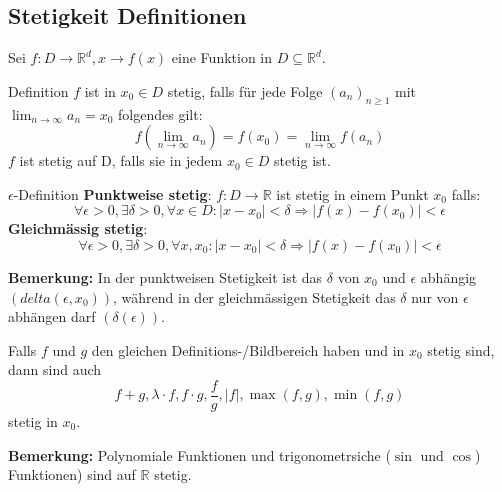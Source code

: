 \documentclass[a4paper,8pt]{extarticle}
\newenvironment{bemerkung}{
   \noindent \textbf{Bemerkung:  }}{}
\def\limn{\lim_{n\to \infty}}
\def\R{\mathbb{R}}
\begin{document}
\subsection{Stetigkeit Definitionen}
Sei $f : D \to \R^d, x \to f(x)$ eine Funktion in $D \subseteq \R^d$.
\begin{mainbox}{Definition}
 $f$ ist in $x_0 \in D$ stetig, falls für jede Folge $(a_n)_{n \geq 1}$ mit $\limn a_n = x_0$ folgendes gilt: $$f(\limn a_n) = f(x_0) = \limn f(a_n)$$
 $f$ ist stetig auf D, falls sie in jedem $x_0 \in D$ stetig ist.
\end{mainbox}
\begin{mainbox}{$\epsilon$-Definition}
  \textbf{Punktweise stetig}: $f: D \to \R$ ist stetig in einem Punkt $x_0$ falls: $$\forall \epsilon > 0, \exists \delta > 0, \forall x \in D: |x - x_0| < \delta \Rightarrow |f(x) - f(x_0)| < \epsilon$$
  \textbf{Gleichmässig stetig}: $$\forall \epsilon > 0, \exists \delta > 0, \forall x, x_0 : |x - x_0| < \delta \Rightarrow |f(x) - f(x_0)| < \epsilon$$

 \end{mainbox}
\begin{bemerkung}
  In der punktweisen Stetigkeit ist das $\delta$ von $x_0$ und $\epsilon$ abhängig $(delta(\epsilon, x_0))$, während in der gleichmässigen Stetigkeit das $\delta$ nur von $\epsilon$ abhängen darf $(\delta(\epsilon))$.
\end{bemerkung}
\begin{subbox}{}
 Falls $f$ und $g$ den gleichen Definitions-/Bildbereich haben und in $x_0$ stetig sind, dann sind auch $$f + g, \lambda \cdot f, f \cdot g, \frac{f}{g}, |f|, \max(f,g), \min(f,g)$$ stetig in $x_0$.
\end{subbox}
\begin{bemerkung}
  Polynomiale Funktionen und trigonometrsiche ($\sin$ und $\cos$) Funktionen) sind auf $\R$ stetig.
\end{bemerkung}
\end{document}
